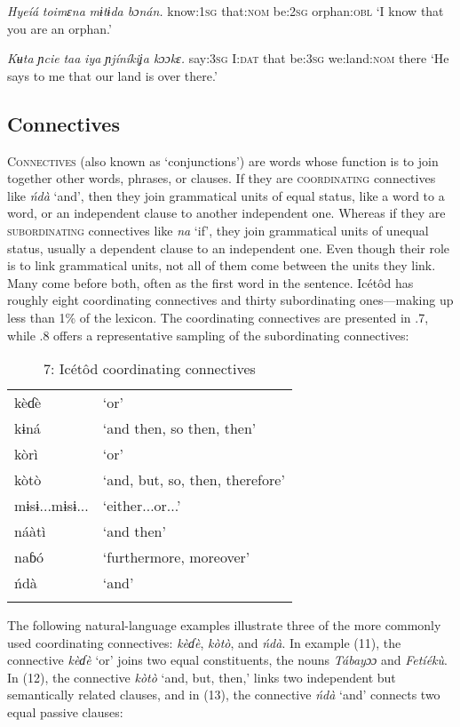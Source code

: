 \textit{Hyeíá}   \textit{toimɛna}\textit{   mɨtɨda   bɔnán.}
know:\textsc{1sg}   that:\textsc{nom}   be:\textsc{2sg}   orphan:\textsc{obl}
‘I know that you are an orphan.’




\textit{Kʉta   ɲcie}   \textit{taa}\textit{   iya     ɲjíníkiʝa    kɔɔkɛ.}
say:\textsc{3sg}   I:\textsc{dat}   that   be:\textsc{3sg}  we:land:\textsc{nom} there
‘He says to me that our land is over there.’






\subsection{Connectives}


\textsc{Connectives} (also known as ‘conjunctions’) are words whose function is to join together other words, phrases, or clauses. If they are \textsc{coordinating} connectives like \textit{ńdà} ‘and’, then they join grammatical units of equal status, like a word to a word, or an independent clause to another independent one. Whereas if they are \textsc{subordinating} connectives like \textit{na} ‘if’, they join grammatical units of unequal status, usually a dependent clause to an independent one. Even though their role is to link grammatical units, not all of them come between the units they link. Many come before both, often as the first word in the sentence. Icétôd has roughly eight coordinating connectives and thirty subordinating ones—making up less than 1\% of the lexicon. The coordinating connectives are presented in .7, while .8 offers a representative sampling of the subordinating connectives:


\begin{table}
\caption{7: Icétôd coordinating connectives}
\label{tab:3}


\begin{tabularx}{\textwidth}{XX}
\lsptoprule

kèɗè & ‘or’\\
kɨná & ‘and then, so then, then’\\
kòrì & ‘or’\\
kòtò & ‘and, but, so, then, therefore’\\
mɨsɨ...mɨsɨ... & ‘either...or...’\\
náàtì & ‘and then’\\
naɓó & ‘furthermore, moreover’\\
ńdà & ‘and’\\
\lspbottomrule
\end{tabularx}
\end{table}
The following natural-language examples illustrate three of the more commonly used coordinating connectives: \textit{kèɗè}, \textit{kòtò}, and \textit{ńdà}. In example (11), the connective \textit{kèɗè} ‘or’ joins two equal constituents, the nouns \textit{Tábayɔɔ} and \textit{Fetíékù}. In (12), the connective \textit{kòtò} ‘and, but, then,’ links two independent but semantically related clauses, and in (13), the connective \textit{ńdà} ‘and’ connects two equal passive clauses:





